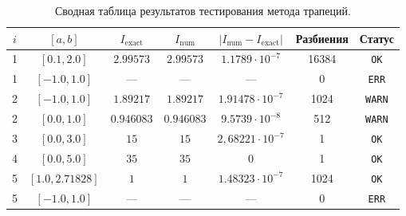 \begin{table}[H]
\centering
\begin{tabular}{|c|c|c|c|c|c|c|}
\hline
$i$ & $[a, b]$ & $I_{\text{exact}}$ & $I_{\text{num}}$ & $|I_{\text{num}} - I_{\text{exact}}|$ & Разбиения & Статус \\ \hline
1 & $[0.1, 2.0]$ & $2.99573$ & $2.99573$ & $1.1789 \cdot 10^{-7}$ & 16384 & \texttt{OK} \\ \hline
1 & $[-1.0, 1.0]$ & --- & --- & --- & 0 & \texttt{ERR} \\ \hline
2 & $[-1.0, 1.0]$ & $1.89217$ & $1.89217$ & $1.91478 \cdot 10^{-7}$ & 1024 & \texttt{WARN} \\ \hline
2 & $[0.0, 1.0]$ & $0.946083$ & $0.946083$ & $9.5739 \cdot 10^{-8}$ & 512 & \texttt{WARN} \\ \hline
3 & $[0.0, 3.0]$ & $15$ & $15$ & $2,68221\cdot 10^{-7}$ & 1 & \texttt{OK} \\ \hline
4 & $[0.0, 5.0]$ & $35$ & $35$ & $0$ & 1 & \texttt{OK} \\ \hline
5 & $[1.0, 2.71828]$ & $1$ & $1$ & $1.48323 \cdot 10^{-7}$ & 1024 & \texttt{OK} \\ \hline
5 & $[-1.0, 1.0]$ & --- & --- & --- & 0 & \texttt{ERR} \\ \hline
\end{tabular}
\caption{Сводная таблица результатов тестирования метода трапеций.}
\end{table}